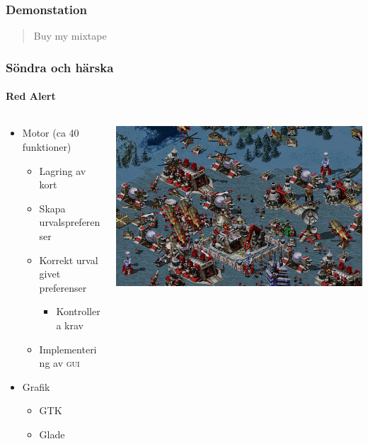 \documentclass{beamer}
\begin{document}
\begin{frame}
    \frametitle{Demonstation}
    
    \begin{quote}
        Buy my mixtape
    \end{quote}
\end{frame}

\begin{frame}
    \frametitle{Söndra och härska}
    \framesubtitle{Red Alert}
    
   
    
    \begin{columns}
        \begin{column}{0.5\textwidth}
             \begin{itemize}
                 \item Motor (ca 40 funktioner)
                 \begin{itemize}
                     \item Lagring av kort
                     \item Skapa urvalspreferenser
                     \item Korrekt urval givet preferenser
                     \begin{itemize}
                         \item Kontrollera krav
                        \end{itemize}
                        \item Implementering av \textsc{gui}
                    \end{itemize}
                    \item Grafik
                    \begin{itemize}
                        \item GTK
                        \item Glade
                    \end{itemize}
                \end{itemize}
        \end{column}
        \begin{column}{0.5\textwidth}
            \includegraphics[width=\textwidth]{ra2.jpg}
        \end{column}
    \end{columns}

\end{frame}
\end{document}
